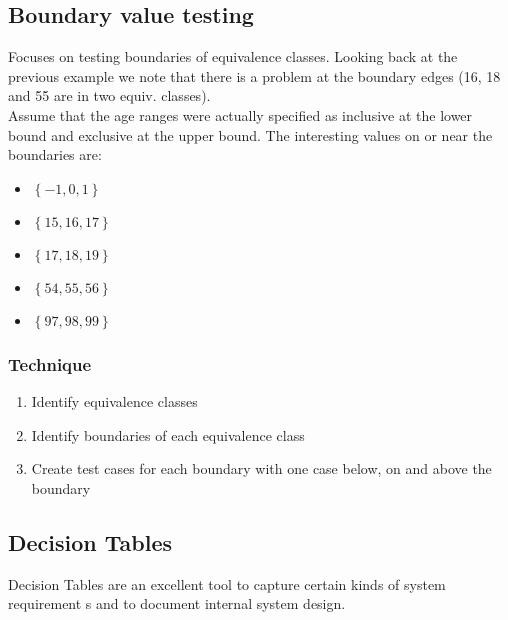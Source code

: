 \documentclass[a4paper]{article}
\begin{document}
\subsection{Boundary value testing}
Focuses on testing boundaries of equivalence classes. Looking back at the
previous example we note that there is a problem at the boundary edges (16, 18
and 55 are in two equiv. classes).\\
Assume that the age ranges were actually specified as inclusive at the lower
bound and exclusive at the upper bound. The interesting values on or near the
boundaries are:
\begin{itemize}
  \item $\left\{ -1, 0, 1 \right\}$
  \item $\left\{ 15,16,17 \right\}$
  \item $\left\{ 17,18,19 \right\}$
  \item $\left\{ 54,55,56 \right\}$
  \item $\left\{ 97,98,99 \right\}$
\end{itemize}

\subsubsection{Technique}
\begin{enumerate}
  \item Identify equivalence classes
  \item Identify boundaries of each equivalence class
  \item Create test cases for each boundary with one case below, on and above
    the boundary
\end{enumerate}

\subsection{Decision Tables}
Decision Tables are an excellent tool to capture certain kinds of system
requirement s and to document internal system design.
\end{document}
